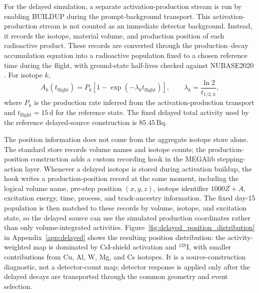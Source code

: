 \documentclass[pdflatex,sn-mathphys-num]{sn-jnl}
\begin{document}
For the delayed simulation, a separate activation-production stream is run by
enabling BUILDUP during the prompt-background transport. This
activation-production stream is not counted as an immediate detector background.
Instead, it records the isotope, material volume, and production position of
each radioactive product. These records are converted through the
production--decay accumulation equation into a radioactive population fixed to a
chosen reference time during the flight, with ground-state half-lives checked
against NUBASE2020 \cite{Kondev2021NUBASE}. For isotope $k$,
\begin{equation}
  A_k(t_{\mathrm{flight}}) = P_k\left[1-\exp\left(-\lambda_k t_{\mathrm{flight}}\right)\right],
  \qquad \lambda_k = \frac{\ln 2}{t_{1/2,k}},
\end{equation}
where $P_k$ is the production rate inferred from the activation-production
transport and $t_{\mathrm{flight}}=15\,\mathrm{d}$ for the reference state.
The fixed delayed total activity used by the reference delayed-source
construction is $85.45\,\mathrm{Bq}$.

The position information does not come from the aggregate isotope store alone.
The standard store records volume names and isotope counts; the
production-position construction adds a custom recording hook in the MEGAlib
stepping-action layer. Whenever a delayed isotope is stored during activation
buildup, the hook writes a production-position record at the same moment,
including the logical volume name, pre-step position $(x,y,z)$, isotope
identifier $1000Z+A$, excitation energy, time, process, and track-ancestry
information. The fixed day-15 population is then matched to these records by
volume, isotope, and excitation state, so the delayed source can use the
simulated production coordinates rather than only volume-integrated activities.
Figure~\ref{fig:delayed_position_distribution} in Appendix~\ref{app:delayed}
shows the resulting position distribution: the activity-weighted map is
dominated by CsI-shield activation and $^{128}$I, with smaller contributions
from Cu, Al, W, Mg, and Cs isotopes. It is a source-construction diagnostic,
not a detector-count map; detector response is applied only after the delayed
decays are transported through the common geometry and event selection.
\end{document}
